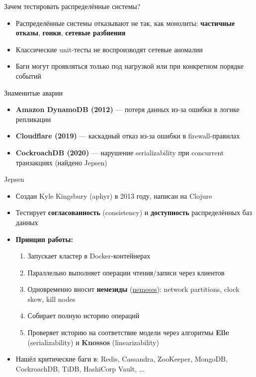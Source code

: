 \documentclass{beamer}
\begin{document}
\begin{frame}{Зачем тестировать распределённые системы?}
\begin{itemize}
  \item Распределённые системы отказывают не так, как монолиты: \textbf{частичные отказы}, \textbf{гонки}, \textbf{сетевые разбиения}
  \item Классические unit-тесты не воспроизводят сетевые аномалии
  \item Баги могут проявляться только под нагрузкой или при конкретном порядке событий
\end{itemize}
\begin{alertblock}{Знаменитые аварии}
\begin{itemize}
  \item \textbf{Amazon DynamoDB (2012)} --- потеря данных из-за ошибки в логике репликации
  \item \textbf{Cloudflare (2019)} --- каскадный отказ из-за ошибки в firewall-правилах
  \item \textbf{CockroachDB (2020)} --- нарушение serializability при concurrent транзакциях (найдено Jepsen)
\end{itemize}
\end{alertblock}
\end{frame}

\begin{frame}{Jepsen}
\begin{itemize}
  \item Создан Kyle Kingsbury (aphyr) в 2013 году, написан на Clojure
  \item Тестирует \textbf{согласованность} (consistency) и \textbf{доступность} распределённых баз данных
  \item \textbf{Принцип работы:}
  \begin{enumerate}
    \item Запускает кластер в Docker-контейнерах
    \item Параллельно выполняет операции чтения/записи через клиентов
    \item Одновременно вносит \textbf{немезиды} (\href{https://github.com/jepsen-io/jepsen/blob/main/doc/tutorial/05-nemesis.md}{nemeses}): network partitions, clock skew, kill nodes
    \item Собирает полную историю операций
    \item Проверяет историю на соответствие модели через алгоритмы \textbf{Elle} (serializability) и \textbf{Knossos} (linearizability)
  \end{enumerate}
  \item Нашёл критические баги в: Redis, Cassandra, ZooKeeper, MongoDB, CockroachDB, TiDB, HashiCorp Vault, ...
\end{itemize}
\end{frame}
\end{document}
